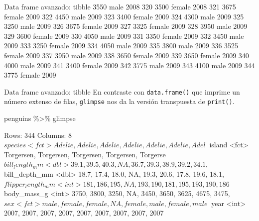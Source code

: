 \documentclass[
  ignorenonframetext,
  aspectratio=169]{beamer}
\newenvironment{Shaded}{\begin{snugshade}}{\end{snugshade}}
\newcommand{\NormalTok}[1]{#1}
\newcommand{\SpecialCharTok}[1]{\textcolor[rgb]{0.00,0.00,0.00}{#1}}
\let\oldverbatim\verbatim
\let\endoldverbatim\endverbatim
\renewenvironment{verbatim}{\tiny\oldverbatim}{\endoldverbatim}
\begin{document}
\begin{frame}[fragile]{Data frame avanzado: tibble}
\begin{verbatim}
319        3550   male 2008
320        3500 female 2008
321        3675 female 2009
322        4450   male 2009
323        3400 female 2009
324        4300   male 2009
325        3250   male 2009
326        3675 female 2009
327        3325 female 2009
328        3950   male 2009
329        3600 female 2009
330        4050   male 2009
331        3350 female 2009
332        3450   male 2009
333        3250 female 2009
334        4050   male 2009
335        3800   male 2009
336        3525 female 2009
337        3950   male 2009
338        3650 female 2009
339        3650 female 2009
340        4000   male 2009
341        3400 female 2009
342        3775   male 2009
343        4100   male 2009
344        3775 female 2009
\end{verbatim}
\end{frame}

\begin{frame}[fragile]{Data frame avanzado: tibble}
\protect\hypertarget{data-frame-avanzado-tibble-7}{}
En contraste con \texttt{data.frame()} que imprime un número extenso de
filas, \texttt{glimpse} nos da la versión transpuesta de
\texttt{print()}.

\begin{Shaded}
\begin{Highlighting}[]
\NormalTok{penguins }\SpecialCharTok{\%\textgreater{}\%}\NormalTok{ glimpse}
\end{Highlighting}
\end{Shaded}

\begin{verbatim}
Rows: 344
Columns: 8
$ species           <fct> Adelie, Adelie, Adelie, Adelie, Adelie, Adelie, Adel~
$ island            <fct> Torgersen, Torgersen, Torgersen, Torgersen, Torgerse~
$ bill_length_mm    <dbl> 39.1, 39.5, 40.3, NA, 36.7, 39.3, 38.9, 39.2, 34.1, ~
$ bill_depth_mm     <dbl> 18.7, 17.4, 18.0, NA, 19.3, 20.6, 17.8, 19.6, 18.1, ~
$ flipper_length_mm <int> 181, 186, 195, NA, 193, 190, 181, 195, 193, 190, 186~
$ body_mass_g       <int> 3750, 3800, 3250, NA, 3450, 3650, 3625, 4675, 3475, ~
$ sex               <fct> male, female, female, NA, female, male, female, male~
$ year              <int> 2007, 2007, 2007, 2007, 2007, 2007, 2007, 2007, 2007~
\end{verbatim}
\end{frame}
\end{document}
